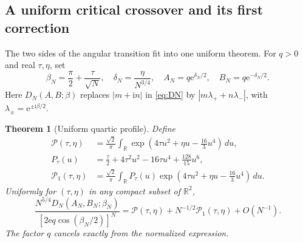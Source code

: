 \documentclass[11pt,a4paper]{article}
\numberwithin{equation}{section}
\newtheorem{theorem}{Theorem}[section]
\theoremstyle{definition}
\theoremstyle{remark}
\newcommand{\R}{\mathbb R}
\newcommand{\ii}{\mathrm i}
\newcommand{\e}{\mathrm e}
\begin{document}
\subsection{A uniform critical crossover and its first correction}\label{sec:crossover}

The two sides of the angular transition fit into one uniform theorem.
For $q>0$ and real $\tau,\eta$, set
\begin{equation}\label{eq:double-scaling}
 \beta_N=\frac\pi2+\frac\tau{\sqrt N},\quad
 \delta_N=\frac\eta{N^{3/4}},\quad
 A_N=q\e^{\delta_N/2},\quad B_N=q\e^{-\delta_N/2}.
\end{equation}
Here $D_N(A,B;\beta)$ replaces $|m+\ii n|$ in \eqref{eq:DN} by
$|m\lambda_++n\lambda_-|$, with $\lambda_\pm=\e^{\pm\ii\beta/2}$.

\begin{theorem}[Uniform quartic profile]\label{thm:quartic-crossover}
Define
\begin{align}
 \mathcal P(\tau,\eta)&=\frac{\sqrt2}{\pi}\int_{\R}
 \exp\left(4\tau u^2+\eta u-\frac{16}{3}u^4\right)\,du,
 \label{eq:quartic-profile}\\
 P_\tau(u)&=\frac\tau2+4\tau^2u^2-16\tau u^4+\frac{128}{15}u^6,
 \label{eq:profile-poly}\\
 \mathcal P_1(\tau,\eta)&=\frac{\sqrt2}{\pi}\int_{\R}P_\tau(u)
 \exp\left(4\tau u^2+\eta u-\frac{16}{3}u^4\right)\,du.
 \label{eq:quartic-profile-one}
\end{align}
Uniformly for $(\tau,\eta)$ in any compact subset of $\R^2$,
\begin{equation}\label{eq:quartic-crossover}
 \frac{N^{5/4}D_N(A_N,B_N;\beta_N)}
 {[2\e q\cos(\beta_N/2)]^N}
 =\mathcal P(\tau,\eta)+N^{-1/2}\mathcal P_1(\tau,\eta)+O(N^{-1}).
\end{equation}
The factor $q$ cancels exactly from the normalized expression.
\end{theorem}
\end{document}
